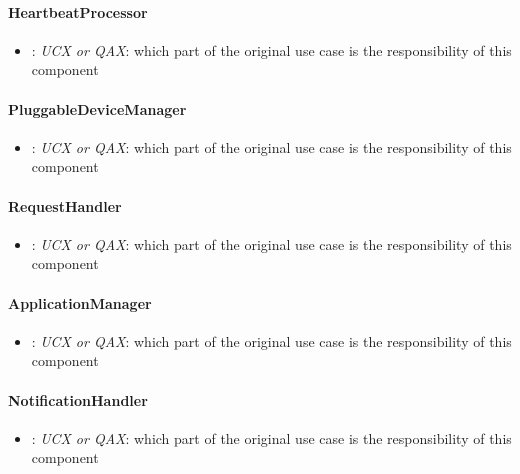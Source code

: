     \paragraph{HeartbeatProcessor}
        \begin{itemize}
            \item: \emph{UCX or QAX}: which part of the original use case is
                                      the responsibility of this component
        \end{itemize}

    \paragraph{PluggableDeviceManager}
        \begin{itemize}
            \item: \emph{UCX or QAX}: which part of the original use case is
                                      the responsibility of this component
        \end{itemize}

    \paragraph{RequestHandler}
        \begin{itemize}
            \item: \emph{UCX or QAX}: which part of the original use case is
                                      the responsibility of this component
        \end{itemize}

    \paragraph{ApplicationManager}
        \begin{itemize}
            \item: \emph{UCX or QAX}: which part of the original use case is
                                      the responsibility of this component
        \end{itemize}

    \paragraph{NotificationHandler}
        \begin{itemize}
            \item: \emph{UCX or QAX}: which part of the original use case is
                                      the responsibility of this component
        \end{itemize}

